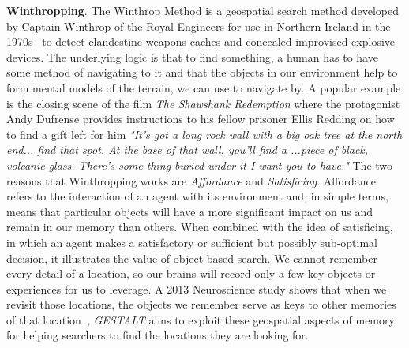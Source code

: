 \textbf{Winthropping}. The Winthrop Method is a geospatial search method developed by Captain Winthrop of the Royal Engineers for use in Northern Ireland in the 1970s~\cite{Keatley2021} to detect clandestine weapons caches and concealed improvised explosive devices. 
The underlying logic is that to find something, a human has to have some method of navigating to it and that the objects in our environment help to form mental models of the terrain, we can use to navigate by. 
A popular example is the closing scene of the film \textit{The Shawshank Redemption} where the protagonist Andy Dufrense provides instructions to his fellow prisoner Ellis Redding on how to find a gift left for him \textit{"It's got a long rock wall with a big oak tree at the north end... find that spot. At the base of that wall, you'll find a ...piece of black, volcanic glass. There's some thing buried under it I want you to have."} 
The two reasons that Winthropping works are \textit{Affordance} and \textit{Satisficing}. Affordance refers to the interaction of an agent with its environment and, in simple terms, means that particular objects will have a more significant impact on us and remain in our memory than others. 
When combined with the idea of satisficing, in which an agent makes a satisfactory or sufficient but possibly sub-optimal decision, it illustrates the value of object-based search. 
We cannot remember every detail of a location, so our brains will record only a few key objects or experiences for us to leverage. 
A 2013 Neuroscience study shows that when we revisit those locations, the objects we remember serve as keys to other memories of that location~\cite{Miller2013}, \textit{GESTALT} aims to exploit these geospatial aspects of memory for helping searchers to find the locations they are looking for.

